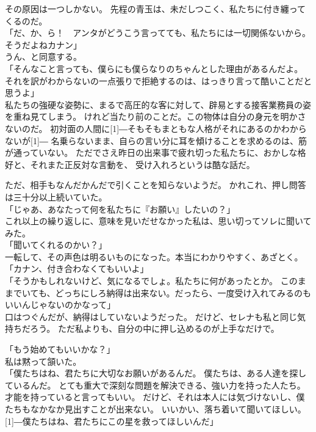 \documentclass[../IHMain]{subfiles}
\begin{document}
その原因は一つしかない。
先程の青玉は、未だしつこく、私たちに付き纏ってくるのだ。\\
「だ、か、ら！　アンタがどうこう言ってても、私たちには一切関係ないから。そうだよねカナン」\\
うん、と同意する。\\
「そんなこと言っても、僕らにも僕らなりのちゃんとした理由があるんだよ。
それを訳がわからないの一点張りで拒絶するのは、はっきり言って酷いことだと思うよ」\\
私たちの強硬な姿勢に、まるで高圧的な客に対して、辟易とする接客業務員の姿を重ね見てしまう。
けれど当たり前のことだ。この物体は自分の身元を明かさないのだ。
初対面の人間に\scalebox{3}[1]{―}そもそもまともな人格がそれにあるのかわからないが\scalebox{3}[1]{―}
名乗らないまま、自らの言い分に耳を傾けることを求めるのは、筋が通っていない。
ただでさえ昨日の出来事で疲れ切った私たちに、おかしな格好と、それまた正反対な言動を、
受け入れろというは酷な話だ。

ただ、相手もなんだかんだで引くことを知らないようだ。
かれこれ、押し問答は三十分以上続いていた。\\

「じゃあ、あなたって何を私たちに『お願い』したいの？」\\
これ以上の繰り返しに、意味を見いだせなかった私は、思い切ってソレに聞いてみた。\\
「聞いてくれるのかい？」\\
一転して、その声色は明るいものになった。本当にわかりやすく、あざとく。\\
「カナン、付き合わなくてもいいよ」\\
「そうかもしれないけど、気になるでしょ。私たちに何があったとか。
このままでいても、どっちにしろ納得は出来ない。だったら、一度受け入れてみるのも
いいんじゃないのかなって」\\
口はつぐんだが、納得はしていないようだった。
だけど、セレナも私と同じ気持ちだろう。
ただ私よりも、自分の中に押し込めるのが上手なだけで。

「もう始めてもいいかな？」\\
私は黙って頷いた。\\
「僕たちはね、君たちに大切なお願いがあるんだ。
僕たちは、ある人達を探しているんだ。
とても重大で深刻な問題を解決できる、強い力を持った人たち。
才能を持っていると言ってもいい。
だけど、それは本人には気づけないし、僕たちもなかなか見出すことが出来ない。
いいかい、落ち着いて聞いてほしい。
\scalebox{3}[1]{―}僕たちはね、君たちにこの星を救ってほしいんだ」\\
\end{document}
